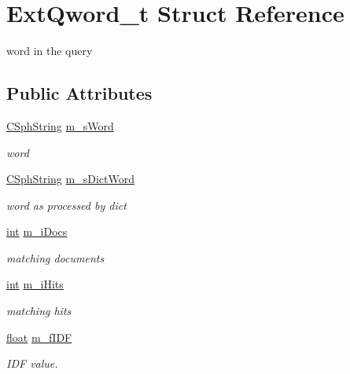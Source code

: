 \hypertarget{structExtQword__t}{\section{Ext\-Qword\-\_\-t Struct Reference}
\label{structExtQword__t}
}


word in the query  


\subsection*{Public Attributes}
\begin{DoxyCompactItemize}
\item 
\hyperlink{structCSphString}{C\-Sph\-String} \hyperlink{structExtQword__t_ab1f6c98ed6a7685eeab11d915926827f}{m\-\_\-s\-Word}
\begin{DoxyCompactList}\small\item\em word \end{DoxyCompactList}\item 
\hyperlink{structCSphString}{C\-Sph\-String} \hyperlink{structExtQword__t_aa3dddf8964085f87b81e90cdf827d598}{m\-\_\-s\-Dict\-Word}
\begin{DoxyCompactList}\small\item\em word as processed by dict \end{DoxyCompactList}\item 
\hyperlink{sphinxexpr_8cpp_a4a26e8f9cb8b736e0c4cbf4d16de985e}{int} \hyperlink{structExtQword__t_a42c3aaa1179294b46d1238bdbb29d59e}{m\-\_\-i\-Docs}
\begin{DoxyCompactList}\small\item\em matching documents \end{DoxyCompactList}\item 
\hyperlink{sphinxexpr_8cpp_a4a26e8f9cb8b736e0c4cbf4d16de985e}{int} \hyperlink{structExtQword__t_a854cb13b14e63a708409c014e9be118c}{m\-\_\-i\-Hits}
\begin{DoxyCompactList}\small\item\em matching hits \end{DoxyCompactList}\item 
\hyperlink{sphinxexpr_8cpp_a0e0d0739f7035f18f949c2db2c6759ec}{float} \hyperlink{structExtQword__t_a60b641a3ed4bf36f28068e07e9cabffe}{m\-\_\-f\-I\-D\-F}
\begin{DoxyCompactList}\small\item\em I\-D\-F value. \end{DoxyCompactList}\item 

\end{DoxyCompactItemize}
